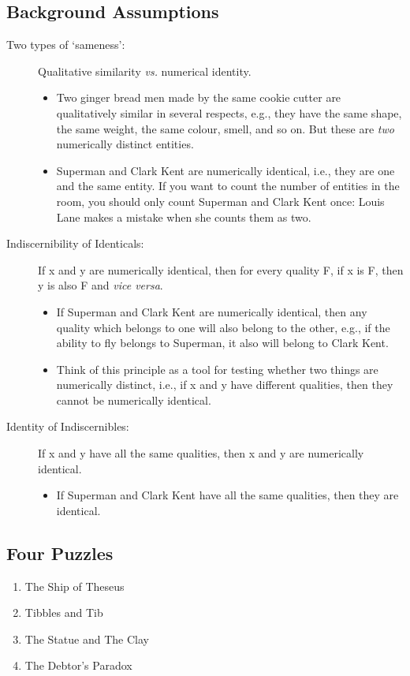 \documentclass[oneside]{article}
\begin{document}
\thispagestyle{fancy}


\subsection*{Background Assumptions}
\begin{description}
\item [Two types of `sameness':] Qualitative similarity \emph{vs.} numerical identity. 
\begin{itemize} 
\item Two ginger bread men made by the same cookie cutter are qualitatively similar in several respects, e.g., they have the same shape, the same weight, the same colour, smell, and so on. But these are \emph{two} numerically distinct entities. 
\item Superman and Clark Kent are numerically identical, i.e., they are one and the same entity. If you want to count the number of entities in the room, you should only count Superman and Clark Kent once: Louis Lane makes a mistake when she counts them as two. 
\end{itemize}
\item [Indiscernibility of Identicals:] If x and y are numerically identical, then for every quality F, if x is F, then y is also F and \emph{vice versa}.  
\begin{itemize}
\item If Superman and Clark Kent are numerically identical, then any quality which belongs to one will also belong to the other, e.g., if the ability to fly belongs to Superman, it also will belong to Clark Kent.
\item Think of this principle as a tool for testing whether two things are numerically distinct, i.e., if x and y have different qualities, then they cannot be numerically identical. 
\end{itemize}
\item [Identity of Indiscernibles:] If x and y have all the same qualities, then x and y are numerically identical. 
\begin{itemize}
\item If Superman and Clark Kent have all the same qualities, then they are identical. 
\end{itemize}
\end{description}

\subsection*{Four Puzzles} 
\begin{enumerate}
\item The Ship of Theseus 
\item Tibbles and Tib 
\item The Statue and The Clay 
\item The Debtor's Paradox 

\end{enumerate}
\end{document}
